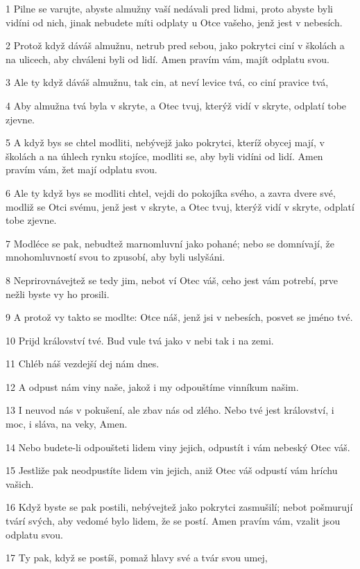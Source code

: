 \par 1 Pilne se varujte, abyste almužny vaší nedávali pred lidmi, proto abyste byli vidíni od nich, jinak nebudete míti odplaty u Otce vašeho, jenž jest v nebesích.
\par 2 Protož když dáváš almužnu, netrub pred sebou, jako pokrytci ciní v školách a na ulicech, aby chváleni byli od lidí. Amen pravím vám, majít odplatu svou.
\par 3 Ale ty když dáváš almužnu, tak cin, at neví levice tvá, co ciní pravice tvá,
\par 4 Aby almužna tvá byla v skryte, a Otec tvuj, kterýž vidí v skryte, odplatí tobe zjevne.
\par 5 A když bys se chtel modliti, nebývejž jako pokrytci, kteríž obycej mají, v školách a na úhlech rynku stojíce, modliti se, aby byli vidíni od lidí. Amen pravím vám, žet mají odplatu svou.
\par 6 Ale ty když bys se modliti chtel, vejdi do pokojíka svého, a zavra dvere své, modliž se Otci svému, jenž jest v skryte, a Otec tvuj, kterýž vidí v skryte, odplatí tobe zjevne.
\par 7 Modléce se pak, nebudtež marnomluvní jako pohané; nebo se domnívají, že mnohomluvností svou to zpusobí, aby byli uslyšáni.
\par 8 Neprirovnávejtež se tedy jim, nebot ví Otec váš, ceho jest vám potrebí, prve nežli byste vy ho prosili.
\par 9 A protož vy takto se modlte: Otce náš, jenž jsi v nebesích, posvet se jméno tvé.
\par 10 Prijd království tvé. Bud vule tvá jako v nebi tak i na zemi.
\par 11 Chléb náš vezdejší dej nám dnes.
\par 12 A odpust nám viny naše, jakož i my odpouštíme vinníkum našim.
\par 13 I neuvod nás v pokušení, ale zbav nás od zlého. Nebo tvé jest království, i moc, i sláva, na veky, Amen.
\par 14 Nebo budete-li odpoušteti lidem viny jejich, odpustít i vám nebeský Otec váš.
\par 15 Jestliže pak neodpustíte lidem vin jejich, aniž Otec váš odpustí vám hríchu vašich.
\par 16 Když byste se pak postili, nebývejtež jako pokrytci zasmušilí; nebot pošmurují tvárí svých, aby vedomé bylo lidem, že se postí. Amen pravím vám, vzalit jsou odplatu svou.
\par 17 Ty pak, když se postíš, pomaž hlavy své a tvár svou umej,

